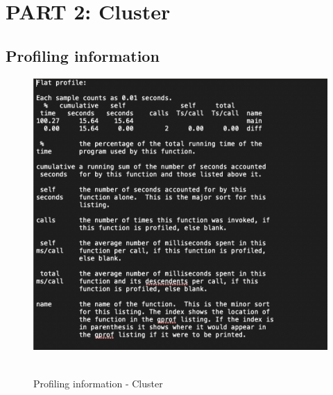 \documentclass[article, 11pt]{article}
\begin{document}
\section{PART 2: Cluster}

\subsection{Profiling information}
\begin{figure}[H]
\centering
\includegraphics[width = 3 in]{1_CLUSTER.png}~
\caption{Profiling information - Cluster} \label{Q1_Profile_Cluster.png}
\end{figure}
\end{document}
